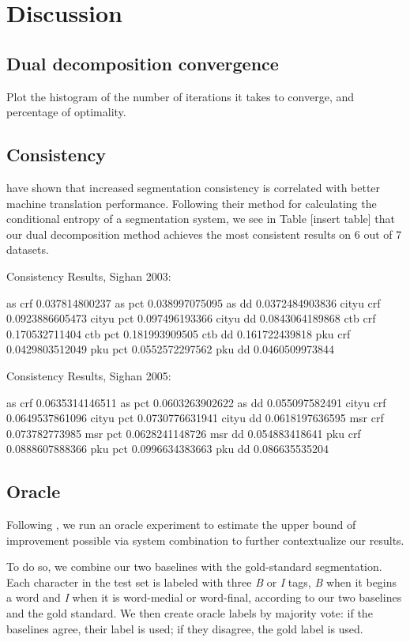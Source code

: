 \section{Discussion}


\subsection{Dual decomposition convergence}
Plot the histogram of the number of iterations it takes to converge, and percentage of optimality. 

\subsection{Consistency}

\cite{Chang:2008:ACL} have shown that increased segmentation consistency is correlated with better machine translation performance. Following their method for calculating the conditional entropy of a segmentation system, we see in Table [insert table] that our dual decomposition method achieves the most consistent results on 6 out of 7 datasets.

Consistency Results, Sighan 2003:

as crf
0.037814800237
as pct
0.038997075095
as dd
0.0372484903836
cityu crf
0.0923886605473
cityu pct
0.097496193366
cityu dd
0.0843064189868
ctb crf
0.170532711404
ctb pct
0.181993909505
ctb dd
0.161722439818
pku crf
0.0429803512049
pku pct
0.0552572297562
pku dd
0.0460509973844


Consistency Results, Sighan 2005:

as crf
0.0635314146511
as pct
0.0603263902622
as dd
0.055097582491
cityu crf
0.0649537861096
cityu pct
0.0730776631941
cityu dd
0.0618197636595
msr crf
0.073782773985
msr pct
0.0628241148726
msr dd
0.054883418641
pku crf
0.0888607888366
pku pct
0.0996634383663
pku dd
0.086635535204

\subsection{Oracle}

Following \cite{Sun:2010:COLING}, we run an oracle experiment to estimate the upper bound of improvement possible via system combination to further contextualize our results. 

To do so, we combine our two baselines with the gold-standard segmentation. Each character in the test set is labeled with three \emph{B} or \emph{I} tags, \emph{B} when it begins a word and \emph{I} when it is word-medial or word-final, according to our two baselines and the gold standard. We then create oracle labels by majority vote: if the baselines agree, their label is used; if they disagree, the gold label is used.

